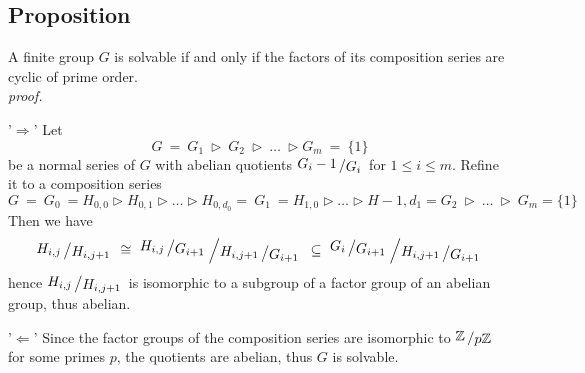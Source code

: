 \documentclass[12pt]{book}
\newcommand{\slant}[2]{{\raisebox{.1em}{$#1$}\left/\raisebox{-.1em}{$#2$}\right.}}
\newcommand{\bigslant}[2]{{\raisebox{.2em}{$#1$}\left/\raisebox{-.2em}{$#2$}\right.}}
\begin{document}
\begin{spacing}{1.3}
\subsection{Proposition} %
A finite group $G$ is solvable if and only if the factors of its composition series are cyclic of prime order.\\
\textit{proof.}
\begin{compactenum}
\item['$\Rightarrow$'] Let 
$$G \ = \ G_1 \ \triangleright \ G_2 \ \triangleright \ \ldots \ \triangleright G_m \ = \ \{1\}$$
be a normal series of $G$ with abelian quotients $\slant{G_i-1}{G_{i}}$ for $1 \leqslant i \leqslant m$. Refine it to a composition series
$$G \ = \ G_0 \ = H_{0,0} \triangleright H_{0,1}  \triangleright  \ldots  \triangleright H_{0,d_0}  =  \ G_1 \ = H_{1,0}  \triangleright \ldots  \triangleright  H-{1,d_1} = G_2 \ \triangleright \ \ldots \ \triangleright \ G_m = \{1\}$$
Then we have
$$\slant{H_{i,j}}{H_{i,j+1}} \ \cong\ \bigslant{\slant{H_{i,j}}{G_{i+1}}}{\slant{H_{i,j+1}}{G_{i+1}}} \ \subseteq \ \bigslant{\slant{G_i}{G_{i+1}}}{\slant{H_{i,j+1}}{G_{i+1}}}$$
hence $\slant{H_{i,j}}{H_{i,j+1}}$ is isomorphic to a subgroup of a factor group of an abelian group, thus abelian.
\item['$\Leftarrow$'] Since the factor groups of the composition series are isomorphic to $\slant{\mathbb{Z}}{p \mathbb{Z}}$ for some primes $p$, the quotients are abelian, thus $G$ is solvable.
\end{compactenum}



\end{spacing}
\end{document}
